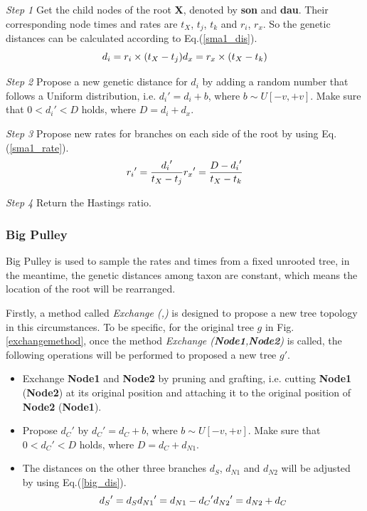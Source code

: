 \documentclass{bmcart}
\begin{document}
\emph{Step 1} Get the child nodes of the root \textbf{X}, denoted by \textbf{son} and \textbf{dau}. Their corresponding node times and rates are $t_X$, $t_j$, $t_k$ and $r_i$, $r_x$. So the genetic distances can be calculated according to Eq.(\ref{sma1_dis}).
\begin{equation}
\label{sma1_dis}
{d_i} = {r_i} \times ({{t_X} - {t_j}})\\
{d_x} = {r_x} \times ({{t_X} - {t_k}})
 \end{equation}

\emph{Step 2} Propose a new genetic distance for $d_i$ by adding a random number that follows a Uniform distribution, i.e.  ${d_i}' = {d_i} + b$, where $b \sim U[ - v, + v]$. Make sure that $0 < {d_i}' < D$ holds, where $D = {d_i} + {d_x}$.

\emph{Step 3} Propose new rates for branches on each side of the root by using Eq.(\ref{sma1_rate}).
\begin{equation}
\label{sma1_rate}
{r_i}' = \frac{{{d_i}'}}{{{t_X} - {t_j}}}\\
{r_x}' = \frac{{D - {d_i}'}}{{{t_X} - {t_k}}}
 \end{equation}

\emph{Step 4} Return the Hastings ratio.
\subsubsection*{Big Pulley}
Big Pulley is used to sample the rates and times from a fixed unrooted tree, in the meantime, the genetic distances among taxon are constant, which means the location of the root will be rearranged.

Firstly, a method called \textit{Exchange (,)} is designed to propose a new tree topology in this circumstances. To be specific, for the original tree $g$ in Fig.\ref{exchangemethod}, once the method \textit{Exchange (\textbf{Node1},\textbf{Node2})} is called, the following operations will be performed to proposed a new tree $g'$.
\begin{itemize}
\item Exchange \textbf{Node1} and \textbf{Node2} by pruning and grafting, i.e. cutting \textbf{Node1} (\textbf{Node2}) at its original position and attaching it to the original position of \textbf{Node2} (\textbf{Node1}).
\item Propose ${d_C}'$ by ${d_C}' = {d_C} + b$, where $b \sim U[ - v, + v]$. Make sure that $0 < {d_C}' < D$ holds, where $D = {d_C} + {d_{N1}}$.
\item The distances on the other three branches $d_S$, $d_{N1}$ and $d_{N2}$ will be adjusted by using Eq.(\ref{big_dis}).
\begin{equation}\label{big_dis}
{d_S}' = {d_S}\\
{d_{N1}}' = {d_{N1}} - {d_C}'\\
{d_{N2}}' = {d_{N2}} + {d_C}
\end{equation}
\end{itemize}
\end{document}
